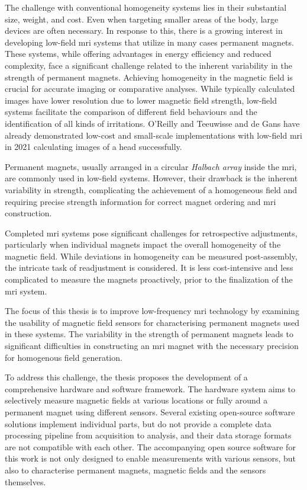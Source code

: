 The challenge with conventional homogeneity systems lies in their
substantial size, weight, and cost. Even when targeting smaller areas of
the body, large devices are often necessary. In response to this, there
is a growing interest in developing low-field \gls{mri} systems that
utilize in many cases permanent magnets. These systems, while offering
advantages in energy efficiency and reduced complexity, face a
significant challenge related to the inherent variability in the
strength of permanent magnets. Achieving homogeneity in the magnetic
field is crucial for accurate imaging or comparative analyses. While
typically calculated images have lower resolution due to lower magnetic
field strength, low-field systems facilitate the comparison of different
field behaviours and the identification of all kinds of irritations.
O'Reilly and Teeuwisse and de Gans  have already
demonstrated low-cost and small-scale implementations with low-field
\gls{mri} in 2021 calculating images of a head successfully.

Permanent magnets, usually arranged in a circular \emph{Halbach array}
inside the \gls{mri}, are commonly used in low-field systems. However,
their drawback is the inherent variability in strength, complicating the
achievement of a homogeneous field and requiring precise strength
information for correct magnet ordering and \gls{mri} construction.

Completed \gls{mri} systems pose significant challenges for
retrospective adjustments, particularly when individual magnets impact
the overall homogeneity of the magnetic field. While deviations in
homogeneity can be measured post-assembly, the intricate task of
readjustment is considered. It is less cost-intensive and less
complicated to measure the magnets proactively, prior to the
finalization of the \gls{mri} system.

The focus of this thesis is to improve low-frequency \gls{mri}
technology by examining the usability of magnetic field sensors for
characterising permanent magnets used in these systems. The variability
in the strength of permanent magnets leads to significant difficulties
in constructing an \gls{mri} magnet with the necessary precision for
homogenous field generation.

To address this challenge, the thesis proposes the development of a
comprehensive hardware and software framework. The hardware system aims
to selectively measure magnetic fields at various locations or fully
around a permanent magnet using different sensors. Several existing
open-source software solutions implement individual parts, but do not
provide a complete data processing pipeline from acquisition to
analysis, and their data storage formats are not compatible with each
other. The accompanying open source software for this work is not only
designed to enable measurements with various sensors, but also to
characterise permanent magnets, magnetic fields and the sensors
themselves.

